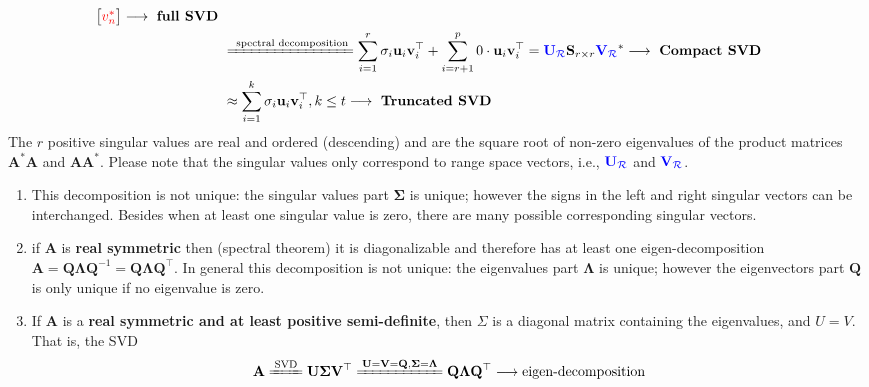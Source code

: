 \documentclass[14pt]{article}
\theoremstyle{definition}
\theoremstyle{remark}
\newenvironment{remark}
  {\pushQED{\qed}\renewcommand{\qedsymbol}{$\triangle$}\remarkx}
  {\popQED\endremarkx}
\begin{document}
\begin{align*}
\begin{bmatrix}
        \color{red}{v_{n}^{*}}
    \end{bmatrix} \longrightarrow \text{ \textbf{full SVD} }                                                                                               \\
     & \xlongequal{\text{ spectral decomposition}}\sum_{i=1}^{r} \sigma_{i} \mathbf{u}_{i} \mathbf{v}_{i}^\top
    + \sum_{i=r+1}^{p} 0\cdot \mathbf{u}_{i} \mathbf{v}_{i}^\top
    = {\color{blue}\mathbf{U}_{\mathcal{R}}}\mathbf{S}_{r\times r}{\color{blue}\mathbf{V}_{\mathcal{R}}}^{*} \longrightarrow \text{ \textbf{Compact SVD} } \\
     & \approx \sum_{i=1}^{k} \sigma_{i} \mathbf{u}_{i} \mathbf{v}_{i}^\top, k\le t \longrightarrow \text{ \textbf{Truncated SVD} }
\end{align*}
The $r$ positive singular values are real and ordered (descending) and are the square root of non-zero
eigenvalues of the product matrices $\mathbf{A}^* \mathbf{A}$ and $\mathbf{A} \mathbf{A}^*$. Please note that the singular values only correspond to range space vectors, i.e., $\color{blue}{\mathbf{U}_{\mathcal{R}}}$ and $\color{blue}{\mathbf{V}_{\mathcal{R}}}$.

\begin{remark}\hfill
    \begin{enumerate}
        \item This decomposition is not unique:
              the singular values part $\mathbf{\Sigma}$ is unique;
              however the signs in the left and right singular vectors can be interchanged.
              Besides when at least one singular value is zero, there are many possible
              corresponding singular vectors.
        \item if $\mathbf{A}$ is \textbf{real symmetric} then (spectral theorem) it is diagonalizable and therefore
              has at least one eigen-decomposition $\mathbf{A}=\mathbf{Q}\mathbf{\Lambda}\mathbf{Q}^{-1} = \mathbf{Q}\mathbf{\Lambda}\mathbf{Q}^\top$.
              In general this decomposition is not unique: the eigenvalues part $\mathbf{\Lambda}$ is unique;
              however the eigenvectors part $\mathbf{Q}$ is only unique if no eigenvalue is zero.
        \item If $\mathbf{A}$ is a \textbf{real symmetric and at least positive semi-definite}, then 
        $\Sigma$ is a diagonal matrix containing the eigenvalues, and $U=V$. 
        That is, the SVD 
        $$
        \mathbf{A} \xlongequal{\text{SVD}} \mathbf{U}\mathbf{\Sigma}\mathbf{V}^\top 
        \xlongequal{\mathbf{U}=\mathbf{V}=\mathbf{Q},\mathbf{\Sigma}=\mathbf{\Lambda}} 
        \mathbf{Q}\mathbf{\Lambda}\mathbf{Q}^\top
        \longrightarrow \text{eigen-decomposition}$$ 
    \end{enumerate}
\end{remark}
\end{document}
